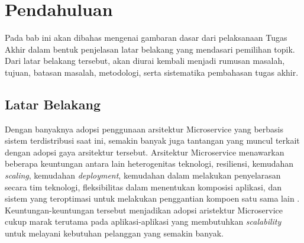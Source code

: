 \chapter{Pendahuluan}

Pada bab ini akan dibahas mengenai gambaran dasar dari pelaksanaan Tugas Akhir dalam bentuk penjelasan latar belakang yang mendasari pemilihan topik. Dari latar belakang tersebut, akan diurai kembali menjadi rumusan masalah, tujuan, batasan masalah, metodologi, serta sistematika pembahasan tugas akhir.                                                                        

\section{Latar Belakang}
\label{ch1-latbel}


Dengan banyaknya adopsi penggunaan arsitektur Microservice yang berbasis sistem terdistribusi saat ini, semakin banyak juga tantangan yang muncul terkait dengan adopsi gaya arsitektur tersebut. Arsitektur Microservice menawarkan beberapa keuntungan antara lain heterogenitas teknologi, resiliensi, kemudahan \textit{scaling}, kemudahan \textit{deployment}, kemudahan dalam melakukan penyelarasan secara tim teknologi, fleksibilitas dalam menentukan komposisi aplikasi, dan sistem yang teroptimasi untuk melakukan penggantian kompoen satu sama lain \citep{building-microservices}. Keuntungan-keuntungan tersebut menjadikan adopsi aristektur Microservice cukup marak terutama pada aplikasi-aplikasi yang membutuhkan \textit{scalability} untuk melayani kebutuhan pelanggan yang semakin banyak.  


